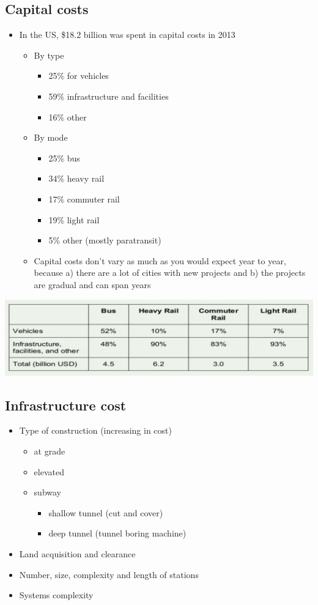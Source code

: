 \documentclass[11pt]{article}
\begin{document}
\subsection{Capital costs}
\label{sec:org9c90305}
\begin{itemize}
\item In the US, \$18.2 billion was spent in capital costs in 2013
\begin{itemize}
\item By type
\begin{itemize}
\item 25\% for vehicles
\item 59\% infrastructure and facilities
\item 16\% other
\end{itemize}
\item By mode
\begin{itemize}
\item 25\% bus
\item 34\% heavy rail
\item 17\% commuter rail
\item 19\% light rail
\item 5\% other (mostly paratransit)
\end{itemize}
\item Capital costs don't vary as much as you would expect year to year, because a) there are a lot of cities with new projects and b) the projects are gradual and can span years
\end{itemize}
\end{itemize}

\begin{center}
\includegraphics[width=.9\linewidth]{.images/cap-cost-breakdown.png}
\end{center}
\subsection{Infrastructure cost}
\label{sec:orgb3f07d6}
\begin{itemize}
\item Type of construction (increasing in cost)
\begin{itemize}
\item at grade
\item elevated
\item subway
\begin{itemize}
\item shallow tunnel (cut and cover)
\item deep tunnel (tunnel boring machine)
\end{itemize}
\end{itemize}
\item Land acquisition and clearance
\item Number, size, complexity and length of stations
\item Systems complexity
\end{itemize}
\end{document}

